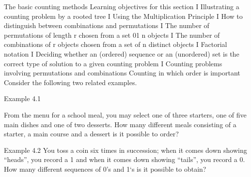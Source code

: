\documentclass{beamer}
\begin{document}
\begin{frame}
The basic counting methods
Learning objectives for this section
I Illustrating a counting problem by a rooted tree
I Using the Multiplication Principle
I How to distinguish between combinations and permutations
I The number of permutations of length r chosen from a set 01 n objects
I The number of combinations of r objects chosen from a set of n distinct objects
I Factorial notation
I Deciding whether an (ordered) sequence or an (unordered) set is the correct type
of solution to a given counting problem
I Counting problems involving permutations and combinations
Counting in which order is important
Consider the following two related examples.

\begin{frame}

\end{frame}
\begin{frame}
Example 4.1 

From the menu for a school meal, you may select one of
three starters, one of ﬁve main dishes and one of two desserts. How
many different meals consisting of a starter, a main course and a
dessert is it possible to order?

Example 4.2 You toss a coin six times in succession; when it comes
down showing “heads”, you record a 1 and when it comes down
showing “tails”, you record a 0. How many different sequences of 0’s
and 1‘s is it possible to obtain?


\end{frame}
\end{frame}
\end{document}
